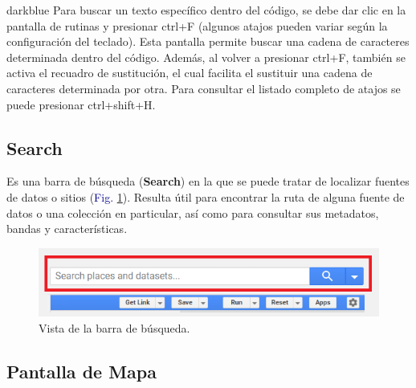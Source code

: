 \documentclass[
  12pt,
  letterpaper,
  twoside]{book}
\begin{document}
\begin{bluebox2}

\begin{awesomeblock}{5pt}{\faLightbulb}{darkblue}
Para buscar un texto específico dentro del código, se debe dar clic en la pantalla de rutinas y presionar ctrl+F (algunos atajos pueden variar según la configuración del teclado). Esta pantalla permite buscar una cadena de caracteres determinada dentro del código. Además, al volver a presionar ctrl+F, también se activa el recuadro de sustitución, el cual facilita el sustituir una cadena de caracteres determinada por otra. Para consultar el listado completo de atajos se puede presionar ctrl+shift+H.

\end{awesomeblock}

\end{bluebox2}

\hypertarget{search}{%
\subsection*{Search}\label{search}}

Es una barra de búsqueda (\textbf{Search}) en la que se puede tratar de localizar fuentes de datos o sitios (\textcolor{darkblue}{Fig.} \ref{fig:f216}). Resulta útil para encontrar la ruta de alguna fuente de datos o una colección en particular, así como para consultar sus metadatos, bandas y características.

\begin{figure}[H]

{\centering \includegraphics[width=0.95\linewidth]{Img/search} 

}

\caption{Vista de la barra de búsqueda.}\label{fig:f216}
\end{figure}

\hypertarget{pantalla-de-mapa}{%
\subsection*{Pantalla de Mapa}\label{pantalla-de-mapa}}
\end{document}
